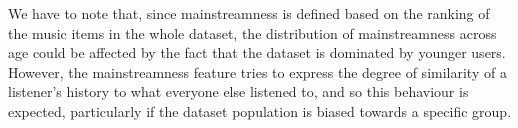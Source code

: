 





We have to note that, since mainstreamness is defined based on the ranking of the music items in the whole dataset, the distribution of mainstreamness across age could be affected by the fact that the dataset is dominated by younger users. However, the mainstreamness feature tries to express the degree of similarity of a listener's history to what everyone else listened to, and so this behaviour is expected, particularly if the dataset population is biased towards a specific group.


